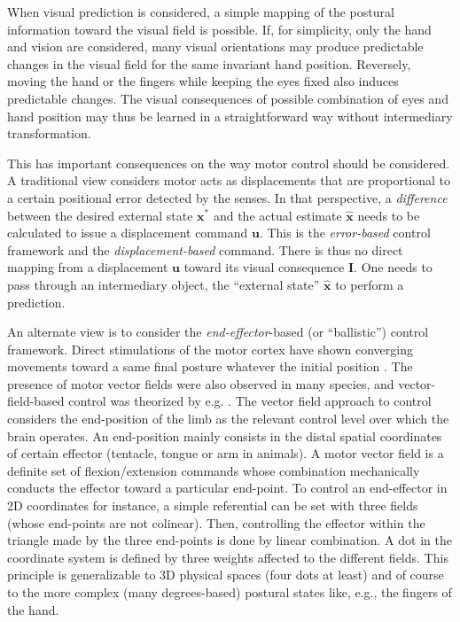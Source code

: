 \documentclass[11pt]{article}
\begin{document}
When visual prediction is considered, a simple mapping of the postural information toward the visual field is possible.
If, for simplicity, only the hand and vision are considered, many visual orientations may produce predictable  changes in the visual field for the same invariant hand position. Reversely, moving the hand or the fingers while keeping the eyes  fixed also induces predictable changes. 
The visual consequences of possible combination of eyes and hand position may thus be learned in a straightforward way without intermediary transformation. 

This has important consequences on the way motor control should be considered. A traditional view considers motor acts as displacements that are proportional to a certain positional error detected by the senses. In that perspective, a \emph{difference} between the desired external state $\boldsymbol{x}^*$ and the actual estimate $\hat{\boldsymbol{x}}$ needs to be calculated to issue a displacement command $\boldsymbol{u}$. This is the \emph{error-based} control framework and the \emph{displacement-based} command. There is thus no direct mapping from a displacement  $\boldsymbol{u}$ toward its visual consequence $\boldsymbol{I}$. One needs to pass through an intermediary object, the ``external state'' $\hat{\boldsymbol{x}}$  to perform a prediction. 

An alternate view is to consider the \emph{end-effector}-based (or ``ballistic'') control framework. 
Direct stimulations of the motor cortex have shown converging movements toward a same final posture whatever the initial position  . The presence of motor vector fields were also observed in many species, and vector-field-based control was theorized by e.g. . The vector field approach to control considers the end-position of the limb as the relevant control level over which the brain operates. An end-position mainly consists in the distal spatial coordinates of certain effector (tentacle, tongue or arm in animals). A motor vector field is a definite set of flexion/extension commands whose combination mechanically conducts the effector toward a particular end-point. To control an end-effector in 2D coordinates for instance, a simple referential can be set with three fields (whose end-points are not colinear). Then, controlling the effector within the triangle made by the three end-points is done by linear combination. A dot in the coordinate system is defined by three weights affected to the different fields. 
This principle is generalizable to 3D physical spaces (four dots at least) and of course to the more complex (many degrees-based) postural states like, e.g., the fingers of the hand.
\end{document}
